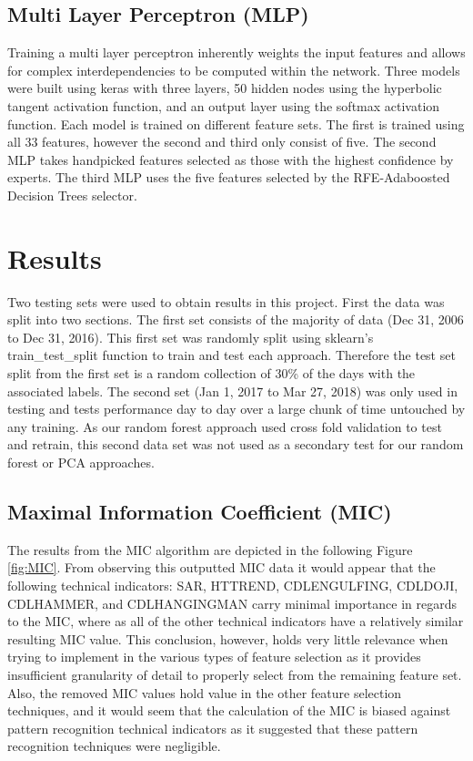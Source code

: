 \documentclass{article}\raggedbottom
\begin{document}
\subsection{Multi Layer Perceptron (MLP)}
Training a multi layer perceptron inherently weights the input features and allows for complex interdependencies to be computed within the network. Three models were built using keras with three layers, 50 hidden nodes using the hyperbolic tangent activation function, and an output layer using the softmax activation function. Each model is trained on different feature sets. The first is trained using all 33 features, however the second and third only consist of five. The second MLP takes handpicked features selected as those with the highest confidence by experts. The third MLP uses the five features selected by the RFE-Adaboosted Decision Trees selector.

\section{Results}
Two testing sets were used to obtain results in this project. First the data was split into two sections. The first set consists of the majority of data (Dec 31, 2006 to Dec 31, 2016). This first set was randomly split using sklearn's train\_test\_split function to train and test each approach. Therefore the test set split from the first set is a random collection of 30\% of the days with the associated labels. The second set (Jan 1, 2017 to Mar 27, 2018) was only used in testing and tests performance day to day over a large chunk of time untouched by any training. As our random forest approach used cross fold validation to test and retrain, this second data set was not used as a secondary test for our random forest or PCA approaches.

\subsection{Maximal Information Coefficient (MIC)}
The results from the MIC algorithm are depicted in the following Figure \ref{fig:MIC}. From observing this outputted MIC data it would appear that the following technical indicators: SAR, HT\textunderscore TREND, CDLENGULFING, CDLDOJI, CDLHAMMER, and CDLHANGINGMAN carry minimal importance in regards to the MIC, where as all of the other technical indicators have a relatively similar resulting MIC value. This conclusion, however, holds very little relevance when trying to implement in the various types of feature selection as it provides insufficient granularity of detail to properly select from the remaining feature set. Also, the removed MIC values hold value in the other feature selection techniques, and it would seem that the calculation of the MIC is biased against pattern recognition technical indicators as it suggested that these pattern recognition techniques were negligible.
\end{document}
